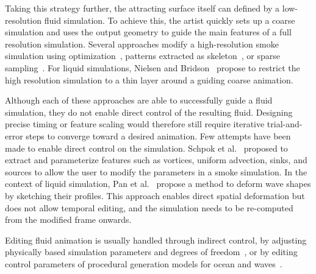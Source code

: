 Taking this strategy further, the attracting surface itself can defined by a low-resolution fluid simulation. To achieve this, the artist quickly sets up a coarse simulation and uses the output geometry to guide the main features of a full resolution simulation.
Several approaches modify a high-resolution smoke simulation using optimization~\cite{Nielsen2009,Nielsen2010}, patterns extracted as skeleton~\cite{Yuan2011}, or sparse sampling~\cite{Huang2013}.
For liquid simulations, Nielsen and Bridson~\cite{Nielsen2011} propose to restrict the high resolution simulation to a thin layer around a guiding coarse animation.

Although each of these approaches are able to successfully guide a fluid simulation, they do not enable direct control of the resulting fluid. Designing precise timing or feature scaling would therefore still require iterative trial-and-error steps to converge toward a desired animation.
Few attempts have been made to enable direct control on the simulation. Schpok et al.~\cite{Schpok2005} proposed to extract and parameterize features such as vortices, uniform advection, sinks, and sources to allow the user to modify the parameters in a smoke simulation. In the context of liquid simulation, Pan et al.~\cite{Pan2013} propose a method to deform wave shapes by sketching their profiles. This approach enables direct spatial deformation but does not allow temporal editing, and the simulation needs to be re-computed from the modified frame onwards.

Editing fluid animation is usually handled through indirect control, by adjusting physically based simulation parameters and degrees of freedom~\cite{Stam1999,Ihmsen2014:IISPH}, or by editing control parameters of procedural generation models for ocean and waves~\cite{Fournier1986,hinsinger2002,Tessendorf2004,jeschke2015water}. 

